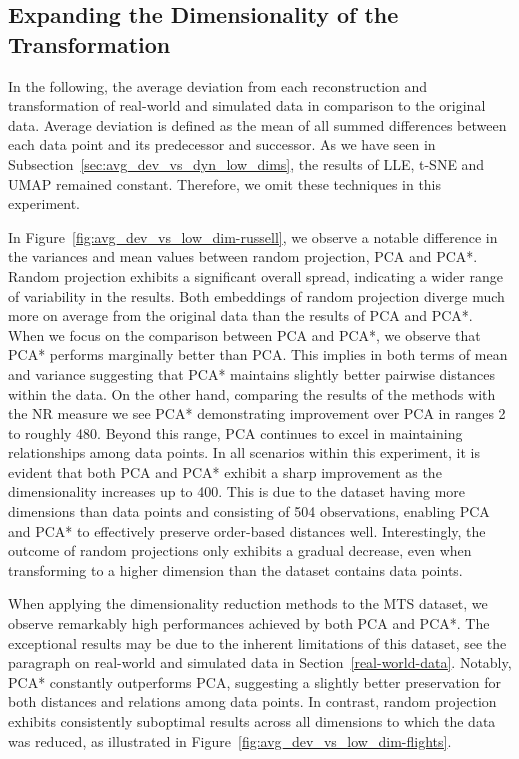 \documentclass[pdftex,12pt,a4paper]{report}
\begin{document}
\subsection{Expanding the Dimensionality of the Transformation}
\FloatBarrier
In the following, the average deviation from each reconstruction and transformation of real-world and simulated data in comparison to the original data.
Average deviation is defined as the mean of all summed differences between each data point and its predecessor and successor.
As we have seen in Subsection~\ref{sec:avg_dev_vs_dyn_low_dims}, the results of LLE, t-SNE and UMAP remained constant.
Therefore, we omit these techniques in this experiment.


In Figure~\ref{fig:avg_dev_vs_low_dim-russell}, we observe a notable difference in the variances and mean values between random projection, PCA and PCA*.
Random projection exhibits a significant overall spread, indicating a wider range of variability in the results.
Both embeddings of random projection diverge much more on average from the original data than the results of PCA and PCA*.
When we focus on the comparison between PCA and PCA*, we observe that PCA* performs marginally better than PCA.
This implies in both terms of mean and variance suggesting that PCA* maintains slightly better pairwise distances within the data.
On the other hand, comparing the results of the methods with the NR measure we see PCA* demonstrating improvement over PCA in ranges 2 to roughly 480.
Beyond this range, PCA continues to excel in maintaining relationships among data points.
In all scenarios within this experiment, it is evident that both PCA and PCA* exhibit a sharp improvement as the dimensionality increases up to 400.
This is due to the dataset having more dimensions than data points and consisting of 504 observations, enabling PCA and PCA* to effectively preserve order-based distances well.
Interestingly, the outcome of random projections only exhibits a gradual decrease, even when transforming to a higher dimension than the dataset contains data points.

When applying the dimensionality reduction methods to the MTS dataset, we observe remarkably high performances achieved by both PCA and PCA*.
The exceptional results may be due to the inherent limitations of this dataset, see the paragraph on real-world and simulated data in Section~\ref{real-world-data}.
Notably, PCA* constantly outperforms PCA, suggesting a slightly better preservation for both distances and relations among data points.
In contrast, random projection exhibits consistently suboptimal results across all dimensions to which the data was reduced, as illustrated in Figure~\ref{fig:avg_dev_vs_low_dim-flights}.
\end{document}
